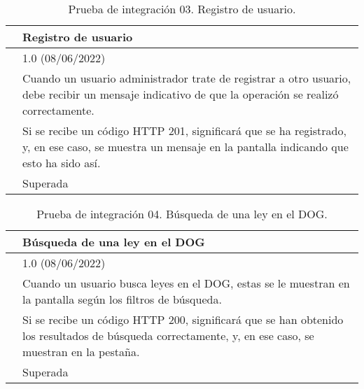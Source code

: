 \begin{table}[H]
\begin{center}
\begin{tabular}{|p{3cm}|p{10cm}|} \hline
\centering {\bf PI-03} & Registro de usuario  \\ \hline\hline
\centering {\bf Versión} & 1.0 (08/06/2022) \\ \hline
\centering {\bf Descripción} & Cuando un usuario administrador trate de registrar a otro usuario, debe recibir un mensaje indicativo de que la operación se realizó correctamente. \\ \hline
\centering {\bf Criterio de aceptación} & Si se recibe un código HTTP 201, significará que se ha registrado, y, en ese caso, se muestra un mensaje en la pantalla indicando que esto ha sido así. \\ \hline
\centering {\bf Estado} & Superada \\ \hline
\end{tabular}
\caption{Prueba de integración 03. Registro de usuario.}
\label{enlacePI3}
\end{center}
\end{table}

\begin{table}[H]
\begin{center}
\begin{tabular}{|p{3cm}|p{10cm}|} \hline
\centering {\bf PI-04} & Búsqueda de una ley en el DOG  \\ \hline\hline
\centering {\bf Versión} & 1.0 (08/06/2022) \\ \hline
\centering {\bf Descripción} & Cuando un usuario busca leyes en el DOG, estas se le muestran en la pantalla según los filtros de búsqueda. \\ \hline
\centering {\bf Criterio de aceptación} & Si se recibe un código HTTP 200, significará que se han obtenido los resultados de búsqueda correctamente, y, en ese caso, se muestran en la pestaña. \\ \hline
\centering {\bf Estado} & Superada \\ \hline
\end{tabular}
\caption{Prueba de integración 04. Búsqueda de una ley en el DOG.}
\label{enlacePI4}
\end{center}
\end{table}

